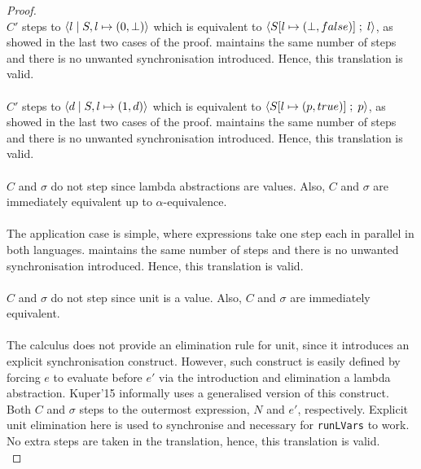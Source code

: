 \documentclass[main.tex]{subfiles}
\begin{document}
\begin{proof}
  \\
  $C'$ steps to $\langle {l}\;\vert\;{S, l \mapsto (0, \bot)} \rangle$ which
  is equivalent to $\langle {S[l \mapsto (\bot, false)]} \; ; \;{l} \rangle$, as showed in the last two
  cases of the proof. \typedlvar maintains the same number of steps and there is
  no unwanted synchronisation introduced. Hence, this translation is valid.  \\

  \\
  $C'$ steps to $\langle {d}\;\vert\;{S, l \mapsto (1, d)} \rangle$ which
  is equivalent to $\langle {S[l \mapsto (p, true)]} \; ; \;{p} \rangle$, as showed in the last two
  cases of the proof. \typedlvar maintains the same number of steps and there is
  no unwanted synchronisation introduced. Hence, this translation is valid. \\


  \\
  $C$ and $\sigma$ do not step since lambda abstractions are values. Also, $C$
  and $\sigma$ are immediately equivalent up to $\alpha$-equivalence.\\


  \\
  The application case is simple, where expressions take one step each in
  parallel in both languages. \typedlvar maintains the same number of steps and
  there is no unwanted synchronisation introduced. Hence, this translation is
  valid. \\


  \\
  $C$ and $\sigma$ do not step since unit is a value. Also, $C$
  and $\sigma$ are immediately equivalent.\\


  \\
  The \lvar calculus does not provide an elimination rule for unit, since it
  introduces an explicit synchronisation construct. However, such construct is
  easily defined by forcing $e$ to evaluate before $e'$ via the introduction and
  elimination a lambda abstraction. Kuper'15 informally uses a generalised
  version of this construct. Both $C$ and $\sigma$ steps to the outermost
  expression, $N$ and $e'$, respectively. Explicit unit elimination here is used
  to synchronise and necessary for \texttt{runLVars} to work. No extra steps are
  taken in the translation, hence, this translation is valid.\\


\end{proof}
\end{document}
